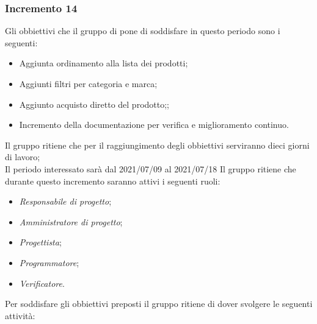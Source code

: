 \subsubsection{Incremento 14}
Gli obbiettivi che il gruppo di pone di soddisfare in questo periodo sono i seguenti:
\begin{itemize}
    \item Aggiunta ordinamento alla lista dei prodotti;
    \item Aggiunti filtri per categoria e marca;
    \item Aggiunto acquisto diretto del prodotto;;
    \item Incremento della documentazione per verifica e miglioramento continuo.
\end{itemize}
Il gruppo ritiene che per il raggiungimento degli obbiettivi serviranno dieci giorni di lavoro;\\
Il periodo interessato sarà dal 2021/07/09 al 2021/07/18
Il gruppo ritiene che durante questo incremento saranno attivi i seguenti ruoli:
\begin{itemize}
    \item \textit{Responsabile di progetto};
    \item \textit{Amministratore di progetto};
    \item \textit{Progettista};
    \item \textit{Programmatore};
    \item \textit{Verificatore}.
\end{itemize}
Per soddisfare gli obbiettivi preposti il gruppo ritiene di dover svolgere le seguenti attività:
